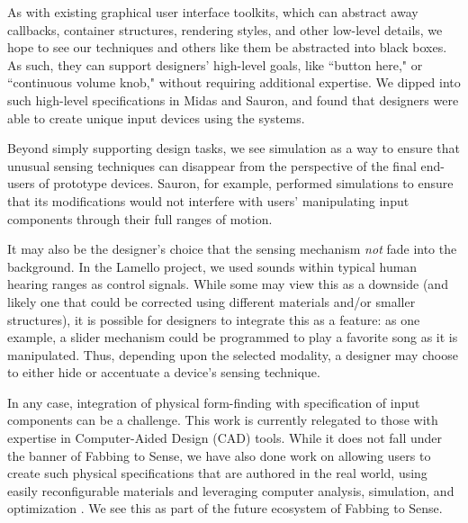 As with existing graphical user interface toolkits, which can abstract away callbacks, container structures, rendering styles, and other low-level details, we hope to see our techniques and others like them be abstracted into black boxes. As such, they can support designers' high-level goals, like ``button here," or ``continuous volume knob," without requiring additional expertise. We dipped into such high-level specifications in Midas and Sauron, and found that designers were able to create unique input devices using the systems.

Beyond simply supporting design tasks, we see simulation as a way to ensure that unusual sensing techniques can disappear from the perspective of the final end-users of prototype devices. Sauron, for example, performed simulations to ensure that its modifications would not interfere with users' manipulating input components through their full ranges of motion.

It may also be the designer's choice that the sensing mechanism \emph{not} fade into the background. In the Lamello project, we used sounds within typical human hearing ranges as control signals. While some may view this as a downside (and likely one that could be corrected using different materials and/or smaller structures), it is possible for designers to integrate this as a feature: as one example, a slider mechanism could be programmed to play a favorite song as it is manipulated. Thus, depending upon the selected modality, a designer may choose to either hide or accentuate a device's sensing technique.

In any case, integration of physical form-finding with specification of input components can be a challenge. This work is currently relegated to those with expertise in Computer-Aided Design (CAD) tools. While it does not fall under the banner of Fabbing to Sense, we have also done work on allowing users to create such physical specifications that are authored in the real world, using easily reconfigurable materials and leveraging computer analysis, simulation, and optimization \cite{savage-mmarks}. We see this as part of the future ecosystem of Fabbing to Sense.


